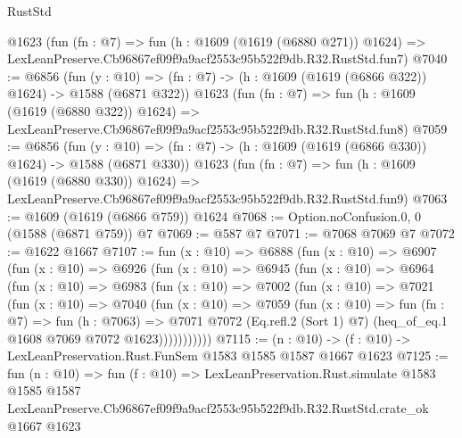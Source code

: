 \begin{lexlean}{RustStd}
\begin{coremodule}
    @1623
    (fun (fn : @7) =>
    fun (h : @1609 (@1619 (@6880 @271)) @1624) =>
    LexLeanPreserve.Cb96867ef09f9a9acf2553c95b522f9db.R32.RustStd.fun7)
@7040 := @6856
    (fun (y : @10) => (fn : @7) -> (h : @1609 (@1619 (@6866 @322)) @1624) -> @1588 (@6871 @322))
    @1623
    (fun (fn : @7) =>
    fun (h : @1609 (@1619 (@6880 @322)) @1624) =>
    LexLeanPreserve.Cb96867ef09f9a9acf2553c95b522f9db.R32.RustStd.fun8)
@7059 := @6856
    (fun (y : @10) => (fn : @7) -> (h : @1609 (@1619 (@6866 @330)) @1624) -> @1588 (@6871 @330))
    @1623
    (fun (fn : @7) =>
    fun (h : @1609 (@1619 (@6880 @330)) @1624) =>
    LexLeanPreserve.Cb96867ef09f9a9acf2553c95b522f9db.R32.RustStd.fun9)
@7063 := @1609 (@1619 (@6866 @759)) @1624
@7068 := Option.noConfusion.{0, 0} (@1588 (@6871 @759)) @7
@7069 := @587 @7
@7071 := @7068 @7069 @7
@7072 := @1622 @1667
@7107 := fun (x : @10) =>
  @6888
    (fun (x : @10) =>
    @6907
      (fun (x : @10) =>
      @6926
        (fun (x : @10) =>
        @6945
          (fun (x : @10) =>
          @6964
            (fun (x : @10) =>
            @6983
              (fun (x : @10) =>
              @7002
                (fun (x : @10) =>
                @7021
                  (fun (x : @10) =>
                  @7040
                    (fun (x : @10) =>
                    @7059
                      (fun (x : @10) =>
                      fun (fn : @7) =>
                      fun (h : @7063) =>
                      @7071
                        @7072
                        (Eq.refl.{2} (Sort 1) @7)
                        (heq_of_eq.{1} @1608 @7069 @7072 @1623)))))))))))
@7115 := (n : @10) -> (f : @10) -> LexLeanPreservation.Rust.FunSem @1583 @1585 @1587 @1667 @1623
@7125 := fun (n : @10) =>
  fun (f : @10) =>
  LexLeanPreservation.Rust.simulate
    @1583
    @1585
    @1587
    LexLeanPreserve.Cb96867ef09f9a9acf2553c95b522f9db.R32.RustStd.crate_ok
    @1667
    @1623
\end{coremodule}
\end{lexlean}
